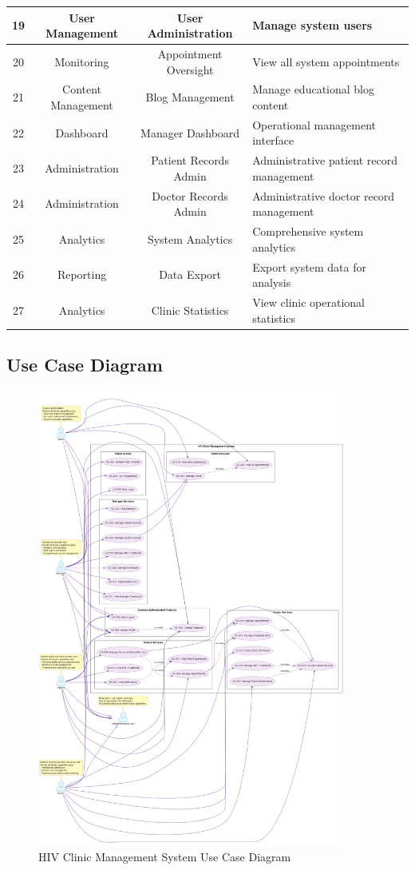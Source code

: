 \documentclass[12pt,a4paper]{article}
\begin{document}
\begin{longtable}{|c|c|c|p{8.5cm}|}
\hline
19 & User Management & User Administration & Manage system users \\
\hline
20 & Monitoring & Appointment Oversight & View all system appointments \\
\hline
21 & Content Management & Blog Management & Manage educational blog content \\
\hline
22 & Dashboard & Manager Dashboard & Operational management interface \\
\hline
23 & Administration & Patient Records Admin & Administrative patient record management \\
\hline
24 & Administration & Doctor Records Admin & Administrative doctor record management \\
\hline
25 & Analytics & System Analytics & Comprehensive system analytics \\
\hline
26 & Reporting & Data Export & Export system data for analysis \\
\hline
27 & Analytics & Clinic Statistics & View clinic operational statistics \\
\hline
\end{longtable}

\subsection{Use Case Diagram}

\begin{figure}[H]
\centering
\includegraphics[width=0.9\textwidth]{diagrams/use_case_diagram.png}
\caption{HIV Clinic Management System Use Case Diagram}
\label{fig:use-case-diagram}
\end{figure}
\end{document}
